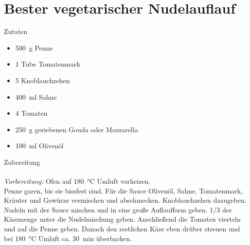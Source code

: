 \section*{Bester vegetarischer Nudelauflauf}
\ihead{}\ohead{}
\cfoot{}
{\Large Zutaten}
\begin{multicols}{2}
\begin{itemize}
    \item \SI{500}{g} Penne
    \item \num{1} Tube Tomatenmark
    \item \num{5} Knoblauchzehen
    \item \SI{400}{ml} Sahne
    \item \num{4} Tomaten
    \item \SI{250}{g} geriebenen Gouda oder Mozzarella
    \item \SI{100}{ml} Olivenöl
\end{itemize}
\end{multicols}
\noindent
{\Large Zubereitung}\\
\\
\textit{Vorbereitung:} Ofen auf \SI{180}{\celsius} Umluft vorheizen.\\
Penne garen, bis sie bissfest sind.
Für die Sauce Olivenöl, Sahne, Tomatenmark, Kräuter und Gewürze vermischen und abschmecken.
Knoblauchzehen dazugeben.
Nudeln mit der Sauce mischen und in eine große Auflaufform geben.
\num{1/3} der Käsemenge unter die Nudelmischung geben.
Anschließend die Tomaten vierteln und auf die Penne geben. 
Danach den restlichen Käse eben drüber streuen und bei \SI{180}{\celsius} Umluft ca. \SI{30}{min} überbacken.